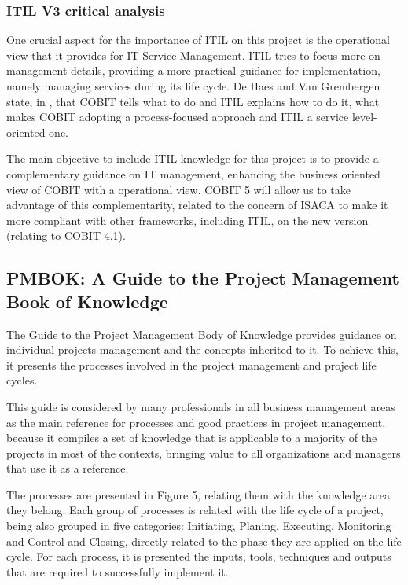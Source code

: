 \subsubsection{ITIL V3 critical analysis}

One crucial aspect for the importance of ITIL on this project is the operational view that it provides for IT Service Management. ITIL tries to focus more on management details, providing a more practical guidance for implementation, namely managing services during its life cycle. De Haes and Van Grembergen state, in \cite{ITGovAndMech}, that COBIT tells what to do and ITIL explains how to do it, what makes COBIT adopting a process-focused approach and ITIL a service level-oriented one.\par
The main objective to include ITIL knowledge for this project is to provide a complementary guidance on IT management, enhancing the business oriented view of COBIT with a operational view. COBIT 5 will allow us to take advantage of this complementarity, related to the concern of ISACA to make it more compliant with other frameworks, including ITIL, on the new version (relating to COBIT 4.1). 

\subsection{PMBOK: A Guide to the Project Management Book of Knowledge}

The Guide to the Project Management Body of Knowledge provides guidance on individual projects management and the concepts inherited to it. To achieve this, it presents the processes involved in the project management and project life cycles.\cite{pmbok5}\par
This guide is considered by many professionals in all business management areas as the main reference for processes and good practices in project management, because it compiles a set of knowledge that is applicable to a majority of the projects in most of the contexts, bringing value to all organizations and managers that use it as a reference.\par 
The processes are presented in Figure 5, relating them with the knowledge area they belong. Each group of processes is related with the life cycle of a project, being also grouped in five categories: Initiating, Planing, Executing, Monitoring and Control and Closing, directly related to the phase they are applied on the life cycle. For each process, it is presented the inputs, tools, techniques and outputs that are required to successfully implement it.\par

